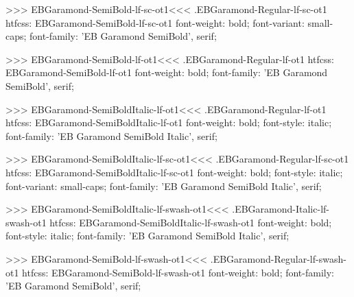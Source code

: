 {{{{{{{>>>
\<EBGaramond-SemiBold-lf-sc-ot1\><<<
.EBGaramond-Regular-lf-sc-ot1
htfcss:  EBGaramond-SemiBold-lf-sc-ot1  font-weight: bold; font-variant: small-caps; font-family: 'EB Garamond SemiBold', serif;

>>>
\<EBGaramond-SemiBold-lf-ot1\><<<
.EBGaramond-Regular-lf-ot1
htfcss:  EBGaramond-SemiBold-lf-ot1  font-weight: bold; font-family: 'EB Garamond SemiBold', serif;

>>>
\<EBGaramond-SemiBoldItalic-lf-ot1\><<<
.EBGaramond-Regular-lf-ot1
htfcss:  EBGaramond-SemiBoldItalic-lf-ot1  font-weight: bold; font-style: italic; font-family: 'EB Garamond SemiBold Italic', serif;

>>>
\<EBGaramond-SemiBoldItalic-lf-sc-ot1\><<<
.EBGaramond-Regular-lf-sc-ot1
htfcss:  EBGaramond-SemiBoldItalic-lf-sc-ot1  font-weight: bold; font-style: italic; font-variant: small-caps; font-family: 'EB Garamond SemiBold Italic', serif;

>>>
\<EBGaramond-SemiBoldItalic-lf-swash-ot1\><<<
.EBGaramond-Italic-lf-swash-ot1
htfcss:  EBGaramond-SemiBoldItalic-lf-swash-ot1  font-weight: bold; font-style: italic; font-family: 'EB Garamond SemiBold Italic', serif;

>>>
\<EBGaramond-SemiBold-lf-swash-ot1\><<<
.EBGaramond-Regular-lf-swash-ot1
htfcss:  EBGaramond-SemiBold-lf-swash-ot1  font-weight: bold; font-family: 'EB Garamond SemiBold', serif;

}}}}}}}
